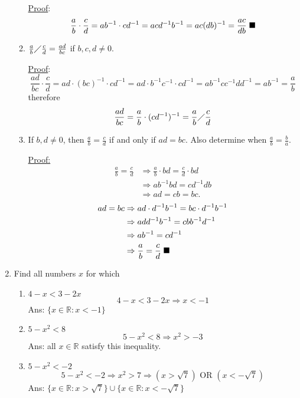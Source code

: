 \documentclass[12pt]{article}
\begin{document}
\begin{enumerate}
\begin{enumerate}
\underline{Proof}:
$$\frac{a}{b} \cdot \frac{c}{d} = ab^{-1} \cdot cd^{-1} = acd^{-1}b^{-1} = ac(db)^{-1} = \frac{ac}{db} \hspace{.1cm} \blacksquare$$

\item $\frac{a}{b} \diagup \frac{c}{d} = \frac{ad}{bc}$ if $b,c,d \neq 0$.

\underline{Proof}:
$$ \frac{ad}{bc} \cdot \frac{c}{d} = ad \cdot (bc)^{-1} \cdot cd^{-1} = ad \cdot b^{-1}c^{-1} \cdot cd^{-1} = ab^{-1}cc^{-1}dd^{-1} = ab^{-1} = \frac{a}{b}$$ therefore $$\frac{ad}{bc} = \frac{a}{b} \cdot (cd^{-1})^{-1} = \frac{a}{b} \diagup \frac{c}{d}$$

\item If $b,d \neq 0$, then $\frac{a}{b} = \frac{c}{d}$ if and only if $ad = bc$. Also determine when $\frac{a}{b} = \frac{b}{a}$.

\underline{Proof:}
\begin{align*} \frac{a}{b} = \frac{c}{d} &\Rightarrow \frac{a}{b} \cdot bd = \frac{c}{d} \cdot bd \\
						        &\Rightarrow ab^{-1}bd = cd^{-1}db \\
						        &\Rightarrow ad = cb = bc.
\end{align*}
\begin{align*} 
ad = bc &\Rightarrow ad \cdot d^{-1}b^{-1} = bc \cdot d^{-1}b^{-1} \\
             &\Rightarrow add^{-1}b^{-1} = cbb^{-1}d^{-1} \\
             &\Rightarrow ab^{-1} = cd^{-1} \\
             &\Rightarrow \frac{a}{b} = \frac{c}{d} \hspace{.1cm} \blacksquare
\end{align*}
\end{enumerate}
\item Find all numbers $x$ for which
\begin{enumerate}
\item $4 - x < 3 - 2x$
$$4 - x < 3 - 2x \Rightarrow x < -1$$
Ans: $\{x\in \mathbb{R} : x < -1\}$
\item $5 - x^2 < 8$
$$5 - x^2 < 8 \Rightarrow x^2 > -3 $$
Ans: all $x\in \mathbb{R}$ satisfy this inequality.

\item $5 - x^2 < -2$
$$ 5 - x^2 < -2 \Rightarrow x^2 > 7 \Rightarrow (x > \sqrt{7}) \text{ OR } (x < -\sqrt{7})$$
Ans: $\{x\in \mathbb{R} : x > \sqrt{7}\} \cup \{x\in \mathbb{R} : x < -\sqrt{7}\} $


\end{enumerate}
\end{enumerate}
\end{document}
